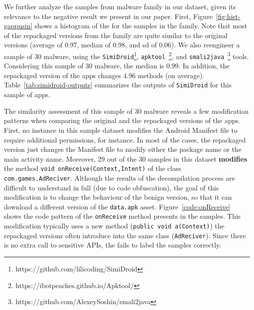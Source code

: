

We further analyze the samples from \gps malware family in our dataset, given its
relevance to the negative result we present in our paper. First,
Figure~\ref{fig:hist-gappusin} shows a histogram of the \sscore for the samples
in the \gps family. Note that most of the repackaged versions from the
\gps family are quite similar to the original versions (average \sscore
of 0.97, median \sscore of 0.98, and sd of 0.06). We also reengineer
a sample of 30 \gps malware, using the \texttt{SimiDroid}\footnote{https://github.com/lilicoding/SimiDroid},
\texttt{apktool}~\footnote{https://ibotpeaches.github.io/Apktool/},
and \texttt{smali2java}~\footnote{https://github.com/AlexeySoshin/smali2java} tools.
Considering this sample of 30 \gps malware, the median \sscore is 0.99. In addition,
the repackaged version of the apps changes 4.96 methods (on average). Table~\ref{tab:simidroid-outputs} summarizes
the outputs of \texttt{SimiDroid} for this sample of \gps apps.

The similarity assessment of this sample of 30 \gps malware reveals a few modification patterns when comparing the original and the
repackaged versions of the apps. First, no instance in this \gps sample dataset
modifies the Android Manifest file to require additional permissions, for instance.
In most of the cases, the repackaged version just changes the Manifest file to modify either
the package name or the main activity name. Moreover, 29 out of the 30 samples in this dataset  {\bf modifies} the 
method \texttt{void onReceive(Context,Intent)} of the class \texttt{com.games.AdReciver}. Although the results of the
decompilation process are difficult to understand in full (due to code obfuscation),
the goal of this modification is to change the behaviour of the benign version, so that it can
download a different version of the \texttt{data.apk} 
asset. Figure~\ref{code:onReceive} shows
the code pattern of the \texttt{onReceive} method presents in the samples. This modification
typically uses a new method (\texttt{public void a(Context)})
the repackaged versions often introduce into the same class (\texttt{AdReciver}).
Since there is no extra call to sensitive APIs, the \mas fails to label
the \gps samples correctly. 

